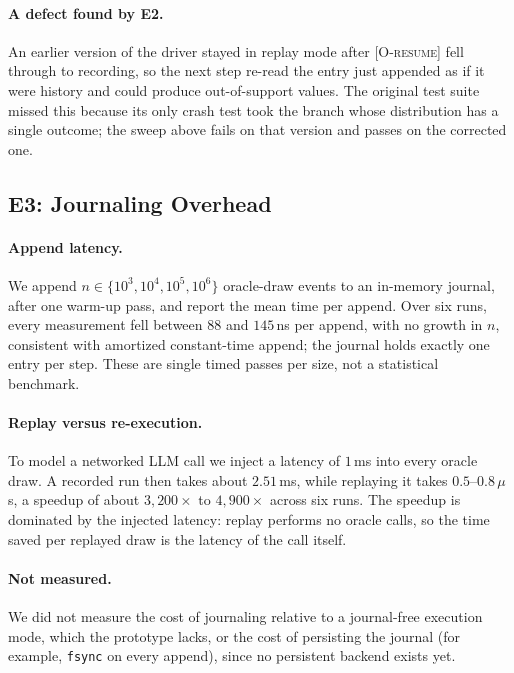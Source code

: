 \paragraph{A defect found by E2.}
An earlier version of the driver stayed in replay mode after \textsc{[O-resume]} fell through to
recording, so the next step re-read the entry just appended as if it were history and could
produce out-of-support values.
The original test suite missed this because its only crash test took the branch whose
distribution has a single outcome; the sweep above fails on that version and passes on the
corrected one.

\subsection{E3: Journaling Overhead}
\label{sec:eval-e3}

\paragraph{Append latency.}
We append $n \in \{10^3, 10^4, 10^5, 10^6\}$ oracle-draw events to an in-memory journal, after
one warm-up pass, and report the mean time per append.
Over six runs, every measurement fell between $88$ and $145$\,ns per append, with no growth in
$n$, consistent with amortized constant-time append; the journal holds exactly one entry per
step.
These are single timed passes per size, not a statistical benchmark.

\paragraph{Replay versus re-execution.}
To model a networked LLM call we inject a latency of $1$\,ms into every oracle draw.
A recorded run then takes about $2.51$\,ms, while replaying it takes $0.5$--$0.8\,\mu$s, a
speedup of about $3{,}200\times$ to $4{,}900\times$ across six runs.
The speedup is dominated by the injected latency: replay performs no oracle calls, so the
time saved per replayed draw is the latency of the call itself.

\paragraph{Not measured.}
We did not measure the cost of journaling relative to a journal-free execution mode, which the
prototype lacks, or the cost of persisting the journal (for example, \texttt{fsync} on every
append), since no persistent backend exists yet.

